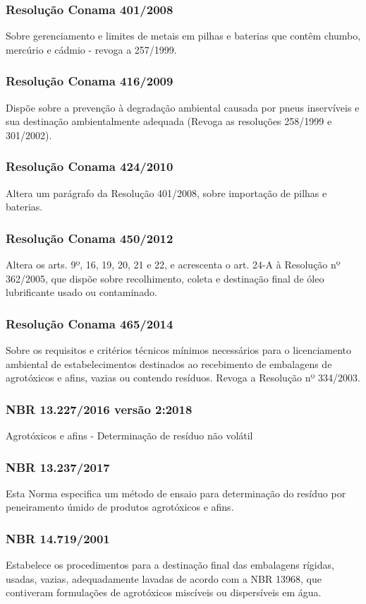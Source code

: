 \begin{subapend}
\begin{subsubapend}
		\subsubsection{Resolução Conama 401/2008}
		Sobre gerenciamento e limites de metais em pilhas e baterias que contêm chumbo, mercúrio e cádmio - revoga a 257/1999.
		\subsubsection{Resolução Conama 416/2009}
		Dispõe sobre a prevenção à degradação ambiental causada por pneus inservíveis e sua destinação ambientalmente adequada (Revoga as resoluções 258/1999 e 301/2002).
		\subsubsection{Resolução Conama 424/2010}
		Altera um parágrafo da Resolução 401/2008, sobre importação de pilhas e baterias.
		\subsubsection{Resolução Conama 450/2012}
		Altera os arts. 9º, 16, 19, 20, 21 e 22, e acrescenta o art. 24-A à Resolução nº 362/2005, que dispõe sobre recolhimento, coleta e destinação final de óleo lubrificante usado ou contaminado.
		\subsubsection{Resolução Conama 465/2014}
		Sobre os requisitos e critérios técnicos mínimos necessários para o licenciamento ambiental de estabelecimentos destinados ao recebimento de embalagens de agrotóxicos e afins, vazias ou contendo resíduos. Revoga a Resolução nº 334/2003.
		\subsubsection{NBR 13.227/2016 versão 2:2018}
		Agrotóxicos e afins - Determinação de resíduo não volátil
		\subsubsection{NBR 13.237/2017}
		Esta Norma especifica um método de ensaio para determinação do resíduo por peneiramento úmido de produtos agrotóxicos e afins. 
		\subsubsection{NBR 14.719/2001}
		Estabelece os procedimentos para a destinação final das embalagens rígidas, usadas, vazias, adequadamente lavadas de acordo com a NBR 13968, que contiveram formulações de agrotóxicos miscíveis ou dispersíveis em água.

\end{subsubapend}
\end{subapend}
